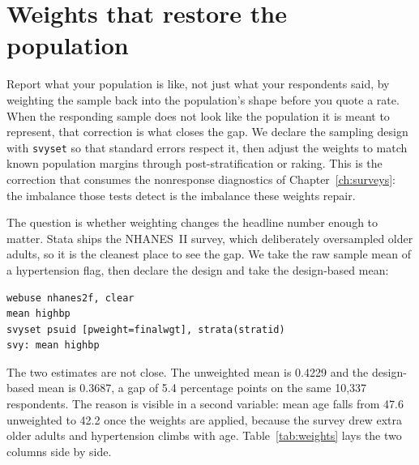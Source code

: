 \documentclass[
    a4paper,
    fontsize=10pt,
    twoside=true,
    numbers=noenddot,
]{kaobook}
\begin{document}
\section{Weights that restore the population}\label{sec:weights}
Report what your population is like, not just what your respondents said, by weighting the sample back into the population's shape before you quote a rate. When the responding sample does not look like the population it is meant to represent, that correction is what closes the gap. We declare the sampling design with \texttt{svyset} so that standard errors respect it, then adjust the weights to match known population margins through post-stratification or raking. This is the correction that consumes the nonresponse diagnostics of Chapter~\ref{ch:surveys}: the imbalance those tests detect is the imbalance these weights repair.

The question is whether weighting changes the headline number enough to matter. Stata ships the NHANES~II survey, which deliberately oversampled older adults, so it is the cleanest place to see the gap. We take the raw sample mean of a hypertension flag, then declare the design and take the design-based mean:
{\footnotesize
\begin{verbatim}
webuse nhanes2f, clear
mean highbp
svyset psuid [pweight=finalwgt], strata(stratid)
svy: mean highbp
\end{verbatim}
}
The two estimates are not close. The unweighted mean is 0.4229 and the design-based mean is 0.3687, a gap of 5.4 percentage points on the same 10{,}337 respondents. The reason is visible in a second variable: mean age falls from 47.6 unweighted to 42.2 once the weights are applied, because the survey drew extra older adults and hypertension climbs with age. Table~\ref{tab:weights} lays the two columns side by side.
\end{document}
